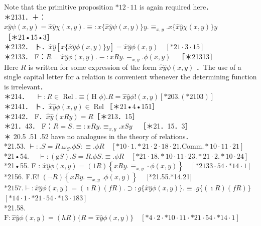 \documentclass[10pt]{article}
\begin{document}
Note that the primitive proposition $* 12 \cdot 11$ is again required here．\\
＊2131．＋：$\hat{x} \hat{y} \psi(x, y)=\hat{x} \hat{y} \chi(x, y) . \equiv: x\{\hat{x} \hat{y} \psi(x, y)\} y . \equiv_{x, y} . x\{\hat{x} \hat{y} \chi(x, y)\} y$\\
［＊21•15•3］\\
＊2132． ト．$\hat{x} \hat{y}[x\{\hat{x} \hat{y} \phi(x, y)\} y]=\hat{x} \hat{y} \phi(x, y) \quad[* 21 \cdot 3 \cdot 15]$\\
＊2133． F：$R=\hat{x} \hat{y} \phi(x, y) . \equiv: x R y . \equiv_{x, y} . \phi(x, y) \quad$［＊21313］\\
Here $R$ is written for some expression of the form $\hat{x} \hat{y} \psi(x, y)$ ．The use of a single capital letter for a relation is convenient whenever the determining function is irrelevant．\\
＊214．$\quad \vdash: R \in \operatorname{Rel} . \equiv($ H $\phi) . R=\widehat{x} \hat{y} \phi!(x, y)[* 203 .(* 2103)]$\\
＊2141． ト．$\hat{x} \hat{y} \phi(x, y) \in \operatorname{Rel}$［＊21•4•151］\\
＊2142． F．$\hat{x} \hat{y}(x R y)=R$［＊213．15］\\
＊21．43． F：$R=S . \equiv: x R y . \equiv_{x, y} . x S y \quad$［＊21．15．3］\\
＊ 20.5 .51 .52 have no analogues in the theory of relations．\\
*21.53. $\vdash: . S=R . \omega_{S} . \phi S: \equiv . \phi R \quad[* 10 \cdot 1 . * 21 \cdot 2 \cdot 18 \cdot 21 . \mathrm{Comm} . * 10 \cdot 11 \cdot 21]$\\
*21•54. $\quad \vdash:(\mathrm{g} S) . S=R . \phi S . \equiv . \phi R \quad[* 21 \cdot 18 . * 10 \cdot 11 \cdot 23 . * 21 \cdot 2 . * 10 \cdot 24]$\\
*21•55. F : $\widehat{x} \hat{y} \phi(x, y)=(1 R)\left\{x R y . \equiv_{x, y} \cdot \phi(x, y)\right\} \quad[* 2133 \cdot 54 \cdot * 14 \cdot 1]$\\
*2156. F.E! $(\neg R)\left\{x R y . \equiv_{x, y} . \phi(x, y)\right\} \quad$ [*21.55.*14.21]\\
$* 2157 . \vdash: \hat{x} \hat{y} \phi(x, y)=(\imath R)(f R) . \supset: g\{\hat{x} \hat{y} \phi(x, y)\} . \equiv . g\{(\imath R)(f R)\}$\\
$[* 14 \cdot 1 \cdot * 21 \cdot 54 \cdot * 13 \cdot 183]$\\
*21.58. $\mathrm{F}: \hat{x} \hat{y} \phi(x, y)=(h R)\{R=\hat{x} \hat{y} \phi(x, y)\} \quad[* 4 \cdot 2 \cdot * 10 \cdot 11 \cdot * 21 \cdot 54 \cdot * 14 \cdot 1]$\\
\end{document}
